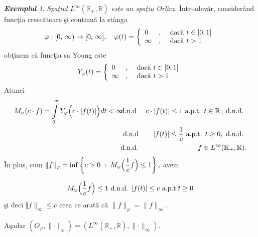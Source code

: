 \documentclass[ a4paper, 12pt]{report}
\theoremstyle{definition}
\theoremstyle{remark}
\newtheorem{exemple}{\bf Exemplul}[section]
\numberwithin{equation}{section}
\begin{document}
\begin{exemple} {\it Spa\c tiul $L^\infty(\mathbb{R}_+, \mathbb{R})$ este un spa\c tiu Orlicz.} \^ Intr-adev\u ar, consider\^ and func\c tia cresc\u atoare \c si continu\u a la st\^ anga
$$\varphi : [0,\, \infty) \rightarrow [0, \, \infty], \quad \varphi(t) = \left\{ \begin{array}{lcl} 0 &,& \hbox { dac\u a } t \in [0,1]\\
\infty &,& \hbox{ dac\u a } t>1 \end{array}\right. $$
ob\c tinem c\u a func\c tia sa Young este
$$Y_\varphi(t) = \left\{ \begin{array}{lcl} 0 &,& \hbox{ dac\u a } t \in [0,1]\\
\infty &,& \hbox{ dac\u a } t>1 \end{array} \right. $$
Atunci
\begin{eqnarray*}
M_\varphi(c \cdot f) = \int\limits_{0}^{\infty} Y_\varphi\Big(c \cdot \lvert f(t) \rvert\Big) dt < \infty \!\!&\hbox{d.n.d}& \!\! c \cdot \lvert f(t) \rvert \leq 1 \hbox{ a.p.t. } t \in \mathbb{R}_+ \! \hbox{ d.n.d. }\\
&\hbox{ d.n.d }& \lvert f(t) \rvert \leq \frac{1}{c} \hbox{ a.p.t. } t \geq 0, \hbox{ d.n.d. } \\
&\hbox{d.n.d.}& f \in L^{\infty}(\mathbb{R}_+,\mathbb{R}).
\end{eqnarray*}
\^ In plus, cum $\lVert f \rVert_\varphi = \inf\left\{ c > 0 \; :\; M_\varphi\Big( \displaystyle\frac{1}{c}f \Big) \leq 1\right\},$ avem

$$M_\varphi\Big(\displaystyle\frac{1}{c}f\Big) \leq 1 \hbox{ d.n.d. } \lvert f(t) \rvert \leq c \hbox{ a.p.t.}  t \geq 0 $$
\c si deci $\Vert f \rVert_{\infty} \leq c$ ceea ce arat\u a  c\u  a $\lVert f\rVert_\varphi = \lVert f \rVert_{\infty}$.

A\c sadar $ (O_\varphi, \lVert \cdot \rVert_\varphi) = (L^\infty(\mathbb{R}_+, \mathbb{R}),\lVert \cdot \rVert_\infty).$
\end{exemple}

\bigskip
\end{document}
